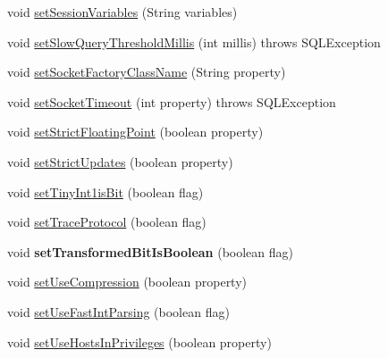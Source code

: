\begin{DoxyCompactItemize}
\item 
void \mbox{\hyperlink{interfacecom_1_1mysql_1_1jdbc_1_1_connection_properties_a9883494dfd2b4b2ed6905ecc13cc167d}{set\+Session\+Variables}} (String variables)
\item 
void \mbox{\hyperlink{interfacecom_1_1mysql_1_1jdbc_1_1_connection_properties_a3cfee5c659ab60c5fdb925490d81ad0f}{set\+Slow\+Query\+Threshold\+Millis}} (int millis)  throws S\+Q\+L\+Exception
\item 
void \mbox{\hyperlink{interfacecom_1_1mysql_1_1jdbc_1_1_connection_properties_ab0f719c12e2d1fe7fe6dd180e8c7a825}{set\+Socket\+Factory\+Class\+Name}} (String property)
\item 
void \mbox{\hyperlink{interfacecom_1_1mysql_1_1jdbc_1_1_connection_properties_a9c60457be4c5136f4c9a46d849b4a5b9}{set\+Socket\+Timeout}} (int property)  throws S\+Q\+L\+Exception
\item 
void \mbox{\hyperlink{interfacecom_1_1mysql_1_1jdbc_1_1_connection_properties_afbb6b6808923b1d248ce45db64bafb28}{set\+Strict\+Floating\+Point}} (boolean property)
\item 
void \mbox{\hyperlink{interfacecom_1_1mysql_1_1jdbc_1_1_connection_properties_a6b1583c38f50feb05d85d5f8357a998c}{set\+Strict\+Updates}} (boolean property)
\item 
void \mbox{\hyperlink{interfacecom_1_1mysql_1_1jdbc_1_1_connection_properties_ac1fb7af1cc73512dd8dac99bdc7a5602}{set\+Tiny\+Int1is\+Bit}} (boolean flag)
\item 
void \mbox{\hyperlink{interfacecom_1_1mysql_1_1jdbc_1_1_connection_properties_a304661cd6d7b203e033ad219de96e0d7}{set\+Trace\+Protocol}} (boolean flag)
\item 
\mbox{\label{interfacecom_1_1mysql_1_1jdbc_1_1_connection_properties_ab6272ecb09e9090cf88f18a052d9f802}} 
void {\bfseries set\+Transformed\+Bit\+Is\+Boolean} (boolean flag)
\item 
void \mbox{\hyperlink{interfacecom_1_1mysql_1_1jdbc_1_1_connection_properties_a60f864890c4947c6a45fb0d99cc7c78d}{set\+Use\+Compression}} (boolean property)
\item 
void \mbox{\hyperlink{interfacecom_1_1mysql_1_1jdbc_1_1_connection_properties_a64d13f1fe9290e34ad189fd0eb13b81d}{set\+Use\+Fast\+Int\+Parsing}} (boolean flag)
\item 
void \mbox{\hyperlink{interfacecom_1_1mysql_1_1jdbc_1_1_connection_properties_aefb08a45df4754d8d6c96b06d36991b5}{set\+Use\+Hosts\+In\+Privileges}} (boolean property)

\end{DoxyCompactItemize}
